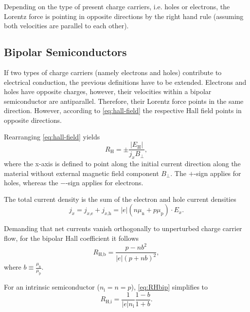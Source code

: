 Depending on the type of present charge carriers, i.e. holes or electrons, the Lorentz force is pointing in opposite directions by the right hand rule (assuming both velocities are parallel to each other).

\subsection{Bipolar Semiconductors}
If two types of charge carriers (namely electrons and holes) contribute to electrical conduction, the previous definitions have to be extended. Electrons and holes have opposite charges, however, their velocities within a bipolar semiconductor are antiparallel. Therefore, their Lorentz force points in the same direction.
However, according to \autoref{eq:hall-field} the respective Hall field points in opposite directions.

Rearranging \autoref{eq:hall-field} yields
\begin{equation}
	R_\text{H} = \pm\frac{\left|E_\text{H}\right|}{j_x B_\bot},
\end{equation}
where the x-axis is defined to point along the initial current direction along the material without external magnetic field component $B_\bot$. The $+$-sign applies for holes, whereas the $-$-sign applies for electrons.

The total current density is the sum of the electron and hole current densities
\begin{equation*}
	j_x = j_{x\text{,e}} + j_{x\text{,h}} = |e|(n\mu_\text{n} + p\mu_\text{p})\cdot E_x.
\end{equation*}

Demanding that net currents vanish orthogonally to unperturbed charge carrier flow, for the bipolar Hall coefficient it follows
\begin{equation}\label{eq:RHbip}
	R_\text{H,b} = \frac{p-nb^2}{|e|(p+nb)^2},
\end{equation}
where $b\equiv\frac{\mu_\text{n}}{\mu_\text{p}}$.

For an intrinsic semiconductor ($n_\text{i}=n=p$), \autoref{eq:RHbip} simplifies to
\begin{equation*}
	R_\text{H,i} = \frac{1}{|e|n_\text{i}}\frac{1-b}{1+b}.
\end{equation*}
